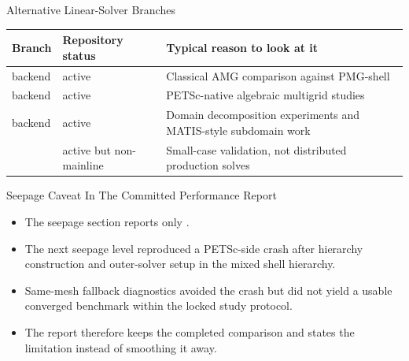\documentclass[aspectratio=169,10pt]{beamer}
\begin{document}
\begin{frame}{Alternative Linear-Solver Branches}
\small
\begin{tabularx}{\textwidth}{p{}p{}Y}
\toprule
\textbf{Branch} & \textbf{Repository status} & \textbf{Typical reason to look at it} \\
\midrule
{} backend & active & Classical AMG comparison against PMG-shell \\
 backend & active & PETSc-native algebraic multigrid studies \\
 backend & active & Domain decomposition experiments and MATIS-style subdomain work \\
 & active but non-mainline & Small-case validation, not distributed production solves \\
\bottomrule
\end{tabularx}
\end{frame}

\begin{frame}{Seepage Caveat In The Committed Performance Report}
\small
\begin{softbox}
\begin{itemize}
  \item The seepage section reports only .
  \item The next seepage level reproduced a PETSc-side crash after hierarchy construction and outer-solver setup in the mixed shell hierarchy.
  \item Same-mesh fallback diagnostics avoided the crash but did not yield a usable converged benchmark within the locked study protocol.
  \item The report therefore keeps the completed comparison and states the limitation instead of smoothing it away.
\end{itemize}
\end{softbox}
\end{frame}
\end{document}
